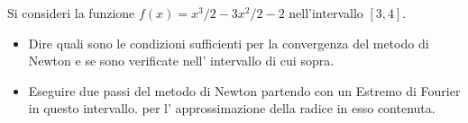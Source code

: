 Si consideri la funzione $f(x)=x^3/2 - 3x^2/2 -2$ nell'intervallo
$[3,4]$.

\begin{itemize}
\item Dire quali sono le condizioni sufficienti per la convergenza del metodo di
Newton e se sono verificate nell' intervallo di cui sopra.
\item Eseguire due passi del metodo di Newton partendo con un Estremo di Fourier in questo intervallo.
per l' approssimazione della radice in esso contenuta.
\end{itemize}
